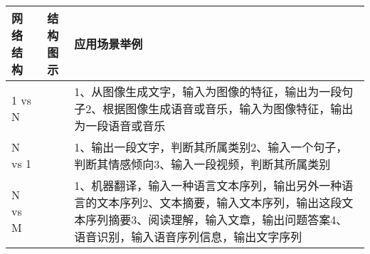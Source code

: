 \begin{longtable}[]{@{}lcl@{}}
\toprule
\begin{minipage}[b]{0.09\columnwidth}\raggedright\strut
网络结构\strut
\end{minipage} & \begin{minipage}[b]{0.23\columnwidth}%
结构图示\strut
\end{minipage} & \begin{minipage}[b]{0.59\columnwidth}\raggedright\strut
应用场景举例\strut
\end{minipage}\tabularnewline
\midrule
\endhead
\begin{minipage}[t]{0.09\columnwidth}\raggedright\strut
1 vs N\strut
\end{minipage} & \begin{minipage}[t]{0.23\columnwidth}%
\end{minipage} & \begin{minipage}[t]{0.59\columnwidth}\raggedright\strut
1、从图像生成文字，输入为图像的特征，输出为一段句子2、根据图像生成语音或音乐，输入为图像特征，输出为一段语音或音乐\strut
\end{minipage}\tabularnewline
\begin{minipage}[t]{0.09\columnwidth}\raggedright\strut
N vs 1\strut
\end{minipage} & \begin{minipage}[t]{0.23\columnwidth}%
\end{minipage} & \begin{minipage}[t]{0.59\columnwidth}\raggedright\strut
1、输出一段文字，判断其所属类别2、输入一个句子，判断其情感倾向3、输入一段视频，判断其所属类别\strut
\end{minipage}\tabularnewline
\begin{minipage}[t]{0.09\columnwidth}\raggedright\strut
N vs M\strut
\end{minipage} & \begin{minipage}[t]{0.23\columnwidth}%
\end{minipage} & \begin{minipage}[t]{0.59\columnwidth}\raggedright\strut
1、机器翻译，输入一种语言文本序列，输出另外一种语言的文本序列2、文本摘要，输入文本序列，输出这段文本序列摘要3、阅读理解，输入文章，输出问题答案4、语音识别，输入语音序列信息，输出文字序列\strut
\end{minipage}\tabularnewline
\bottomrule
\end{longtable}

